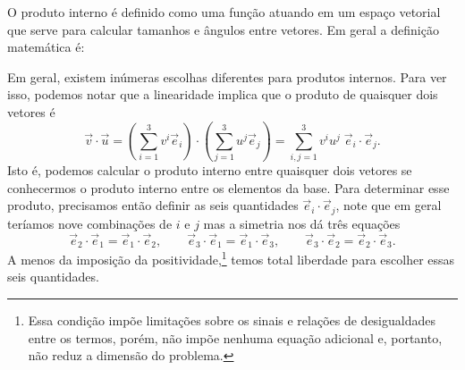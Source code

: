 O produto interno é definido como uma função atuando em um espaço vetorial que
serve para calcular tamanhos e ângulos entre vetores. Em geral a definição
matemática é:

Em geral, existem inúmeras escolhas diferentes para produtos internos. Para ver
isso, podemos notar que a linearidade implica que o produto de quaisquer dois
vetores é
$$ \vec{v}\cdot\vec{u} = \left(\sum_{i=1}^3v^i\vec{e}_i\right)\cdot \left(\sum_{j=1}^3u^j\vec{e}_j\right) = \sum_{i,j=1}^3v^iu^j \;\vec{e}_i\cdot\vec{e}_j.$$
Isto é, podemos calcular o produto interno entre quaisquer dois vetores se
conhecermos o produto interno entre os elementos da base. Para determinar esse
produto, precisamos então definir as seis quantidades $\vec{e}_i\cdot\vec{e}_j$,
note que em geral teríamos nove combinações de $i$ e $j$ mas a simetria nos dá
três equações
\begin{equation}
	\vec{e}_2\cdot\vec{e}_1 = \vec{e}_1\cdot\vec{e}_2, \qquad \vec{e}_3\cdot\vec{e}_1 = \vec{e}_1\cdot\vec{e}_3, \qquad \vec{e}_3\cdot\vec{e}_2 = \vec{e}_2\cdot\vec{e}_3.
\end{equation}
A menos da imposição da positividade,\footnote{Essa condição impõe limitações
	sobre os sinais e relações de desigualdades entre os termos, porém, não impõe
	nenhuma equação adicional e, portanto, não reduz a dimensão do problema.} temos
total liberdade para escolher essas seis quantidades.

